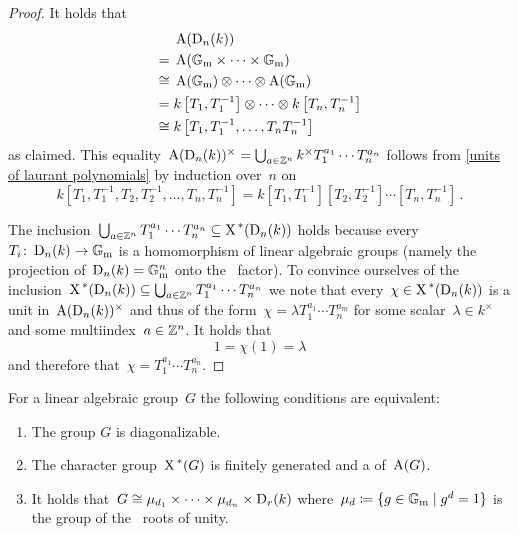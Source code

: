 \begin{proof}
  It holds that
  \begin{align*}
           &  \operatorname{A}(\operatorname{D}_n(k)) \\
        ={}&  \operatorname{A}(\mathbb{G}_{\text{m}} \times \dotsb \times \mathbb{G}_{\text{m}})  \\
    \cong{}&  \operatorname{A}(\mathbb{G}_{\text{m}}) \otimes \dotsb \otimes \operatorname{A}(\mathbb{G}_{\text{m}}) \\
        ={}&  k\left[ T_1, T_1^{-1} \right]
              \otimes \dotsb \otimes
              k\left[ T_n, T_n^{-1} \right]  \\
    \cong{}&  k\left[ T_1, T_1^{-1}, \dotsc, T_n T_n^{-1} \right]
  \end{align*}
  as claimed.
  This equality~$\operatorname{A}(\operatorname{D}_n(k))^\times = \bigcup_{a \in \mathbb{Z}^n} k^\times T_1^{a_1} \dotsm T_n^{a_n}$ follows from \cref{units of laurant polynomials} by induction over~$n$ on
  \[
      k\left[ T_1, T_1^{-1}, T_2, T_2^{-1}, \dotsc, T_n, T_n^{-1} \right]
    = k\left[ T_1, T_1^{-1} \right]
       \left[ T_2, T_2^{-1} \right]
       \dotsm
       \left[ T_n, T_n^{-1} \right] \,.
  \]
  
  The inclusion~$\bigcup_{a \in \mathbb{Z}^n} T_1^{a_1} \dotsm T_n^{a_n} \subseteq \operatorname{X}^{\,*}(\operatorname{D}_n(k))$ holds because every~$T_i \colon \operatorname{D}_n(k) \to \mathbb{G}_{\text{m}}$ is a homomorphism of linear algebraic groups (namely the projection of~$\operatorname{D}_n(k) = \mathbb{G}_{\text{m}}^n$ onto the~ factor).
  To convince ourselves of the inclusion~$\operatorname{X}^{\,*}(\operatorname{D}_n(k)) \subseteq \bigcup_{a \in \mathbb{Z}^n} T_1^{a_1} \dotsm T_n^{a_n}$ we note that every~$\chi \in \operatorname{X}^{\,*}(\operatorname{D}_n(k))$ is a unit in~$\operatorname{A}(\operatorname{D}_n(k))^\times$ and thus of the form~$\chi = \lambda T_1^{a_1} \dotsm T_n^{a_m}$ for some scalar~$\lambda \in k^\times$ and some multiindex~$a \in \mathbb{Z}^n$.
  It holds that
  \[
    1 = \chi(1) = \lambda
  \]
  and therefore that~$\chi = T_1^{a_1} \dotsm T_n^{a_n}$.
\end{proof}


\begin{theorem}
  \label{diag groups via char group}
  For a linear algebraic group~$G$ the following conditions are equivalent:
  \begin{enumerate}
    \item
      \label{G is diagonalizable}
      The group $G$ is diagonalizable.
    \item
      \label{X(G) is nice}
      The character group~$\operatorname{X}^{\,*}(G)$ is finitely generated and a  of~$\operatorname{A}(G)$.
    \item
      \label{G is product of things}
      It holds that~$G \cong \mu_{d_1} \times \dotsb \times \mu_{d_n} \times \operatorname{D}_r(k)$ where~$\mu_d \defined \{g \in \Gmult \suchthat g^d = 1\}$ is the group of the~ roots of unity.
  \end{enumerate}
\end{theorem}



